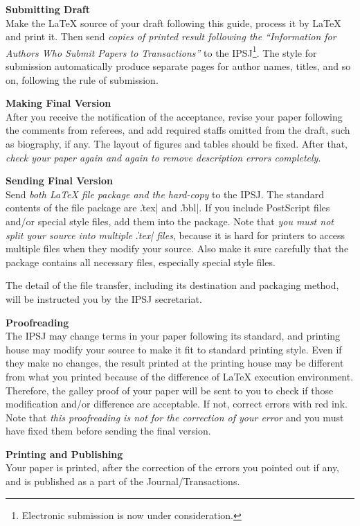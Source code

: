 \begin{Enumerate}
\item {\bf Submitting Draft}\\
Make the {\LaTeX} source of your draft following this guide, process it by
{\LaTeX} and print it.  Then send {\em copies of printed result following
the ``Information for Authors Who Submit Papers to Transactions''} to the
IPSJ\footnote{Electronic submission is now under consideration.}.  The
style for submission automatically produce separate pages for author names,
titles, and so on, following the rule of submission.

\item {\bf Making Final Version}\\
After you receive the notification of the acceptance, revise your paper
following the comments from referees, and add required staffs omitted from
the draft, such as biography, if any.  The layout of figures and tables
should be fixed.  After that, {\em check your paper again and again to
remove description errors completely}.

\item {\bf Sending Final Version}\\
Send {\em both {\LaTeX} file package and the hard-copy} to the IPSJ.  The
standard contents of the file package are \|.tex| and \|.bbl|.  If you
include PostScript files and/or special style files, add them into the
package.  Note that {\em you must not split your source into multiple
\|.tex| files}, because it is hard for printers to access multiple files
when they modify your source.  Also make it sure carefully that the package
contains all necessary files, especially special style files.

The detail of the file transfer, including its destination and packaging
method, will be instructed you by the IPSJ secretariat.

\item {\bf Proofreading}\\
The IPSJ may change terms in your paper following its standard, and printing
house may modify your source to make it fit to standard printing style.  Even
if they make no changes, the result printed at the printing house may be
different from what you printed because of the difference of {\LaTeX}
execution environment.  Therefore, the galley proof of your paper will be
sent to you to check if those modification and/or difference are
acceptable.  If not, correct errors with red ink.  Note that {\em this
proofreading is not for the correction of your error} and you must have
fixed them before sending the final version.

\item {\bf Printing and Publishing}\\
Your paper is printed, after the correction of the errors you pointed out if
any, and is published as a part of the Journal\slash Transactions.
\end{Enumerate}%

